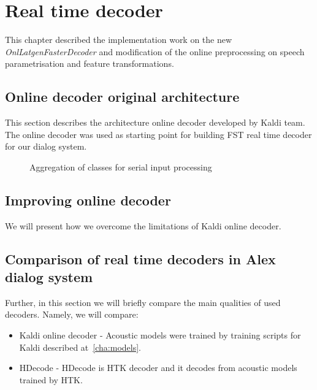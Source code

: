 \chapter{Real time decoder}
\label{cha:decoder}

This chapter described the implementation work
on the new {\it OnlLatgenFasterDecoder}\/ and 
modification of the online preprocessing on speech parametrisation and feature transformations.



\section{Online decoder original architecture} 
\label{sec:kaldi_decoder_architecture}
This section describes the architecture online decoder developed by Kaldi team.
The online decoder was used as starting point for building \ac{FST} real time decoder for our dialog system.

\begin{figure}[!ph]
    \begin{center}
        
    \caption{Aggregation of classes for serial input processing}
    \label{fig:classes} 
    \end{center}
\end{figure}


\section{Improving online decoder} 
\label{sec:improve}
We will present how we overcome the limitations of Kaldi online decoder.



\section[Comparison of real time decoders]{Comparison of real time decoders in Alex dialog system} 
\label{sec:comparison_of_real_time_decoders_in_alex_dialog_system}
Further, in this section we will briefly compare the main qualities of used decoders.
Namely, we will compare: 
\begin{itemize}
    \item Kaldi online decoder - Acoustic models were trained by training scripts for Kaldi described at~\ref{cha:models}.
    \item HDecode - HDecode is \ac{HTK} decoder and it decodes from acoustic models trained by \ac{HTK}.
\end{itemize}


